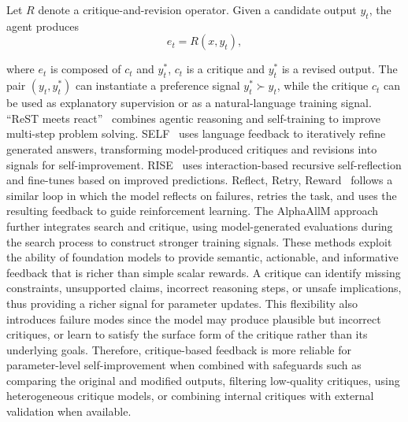 \documentclass{article}
\begin{document}
Let $R$ denote a critique-and-revision operator. Given a candidate output $y_t$, the agent produces
\begin{equation}
e_t=R(x,y_t), 
\end{equation}


where $e_t$ is composed of $c_t$ and $y_t^\ast$, $c_t$ is a critique and $y_t^\ast$ is a revised output. The pair $(y_t,y_t^\ast)$ can instantiate a preference signal $y_t^\ast \succ y_t$, while the critique $c_t$ can be used as explanatory supervision or as a natural-language training signal. ``ReST meets react''~\citep{aksitov2023rest} combines agentic reasoning and self-training to improve multi-step problem solving. SELF~\citep{lu2023self} uses language feedback to iteratively refine generated answers, transforming model-produced critiques and revisions into signals for self-improvement. RISE~\citep{qu2024recursive} uses interaction-based recursive self-reflection and fine-tunes based on improved predictions. Reflect, Retry, Reward~\citep{bensal2025reflect} follows a similar loop in which the model reflects on failures, retries the task, and uses the resulting feedback to guide reinforcement learning. The AlphaAllM approach~\citep{tian2024toward} further integrates search and critique, using model-generated evaluations during the search process to construct stronger training signals. These methods exploit the ability of foundation models to  provide semantic, actionable, and informative feedback that is richer than simple scalar rewards. A critique can identify missing constraints, unsupported claims, incorrect reasoning steps, or unsafe implications, thus providing a richer signal for parameter updates. This flexibility also introduces failure modes since the model may produce plausible but incorrect critiques, or learn to satisfy the surface form of the critique rather than its underlying goals.  Therefore, critique-based feedback is more reliable for parameter-level self-improvement when combined with safeguards such as comparing the original and modified outputs, filtering low-quality critiques, using heterogeneous critique models, or combining internal critiques with external validation when available.
\end{document}
